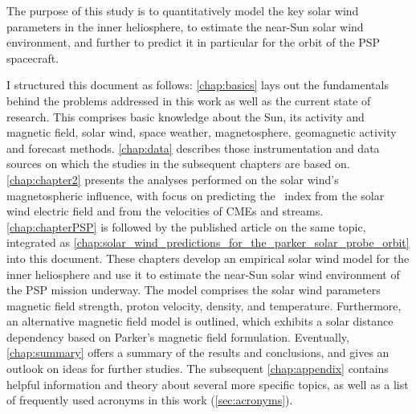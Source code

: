 The purpose of this study is to quantitatively model the key solar wind parameters in the inner heliosphere, to estimate the near-Sun solar wind environment, and further to predict it in particular for the orbit of the PSP spacecraft.

\bigskip

I structured this document as follows: \autoref{chap:basics} lays out the fundamentals behind the problems addressed in this work as well as the current state of research. This comprises basic knowledge about the Sun, its activity and magnetic field, solar wind, space weather, magnetosphere, geomagnetic activity and forecast methods. \autoref{chap:data} describes those instrumentation and data sources on which the studies in the subsequent chapters are based on. \autoref{chap:chapter2} presents the analyses performed on the solar wind's magnetospheric influence, with focus on predicting the \Kp~index from the solar wind electric field and from the velocities of CMEs and streams. \autoref{chap:chapterPSP} is followed by the published article on the same topic, integrated as \autoref{chap:solar_wind_predictions_for_the_parker_solar_probe_orbit} into this document. These chapters develop an empirical solar wind model for the inner heliosphere and use it to estimate the near-Sun solar wind environment of the PSP mission underway. The model comprises the solar wind parameters magnetic field strength, proton velocity, density, and temperature. Furthermore, an alternative magnetic field model is outlined, which exhibits a solar distance dependency based on Parker's magnetic field formulation. Eventually, \autoref{chap:summary} offers a summary of the results and conclusions, and gives an outlook on ideas for further studies. The subsequent \autoref{chap:appendix} contains helpful information and theory about several more specific topics, as well as a list of frequently used acronyms in this work (\autoref{sec:acronyms}).


